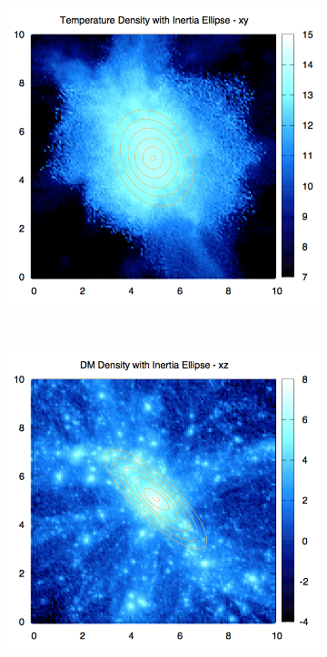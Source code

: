 \documentclass[journal]{IEEEtran}
\begin{document}
\begin{figure}[!t]
\begin{subfigure}[t]{0.3\textwidth}
	\end{subfigure}
	\quad
	\begin{subfigure}[t]{0.3\textwidth}
		\centering
		\includegraphics[width=\linewidth]{TempDenEllipxy.png}
	\end{subfigure}
	\\
	\begin{subfigure}[t]{0.3\textwidth}
		\centering
		\includegraphics[width=\linewidth]{DMDenEllipxz.png}

\end{subfigure}
\end{figure}
\end{document}
